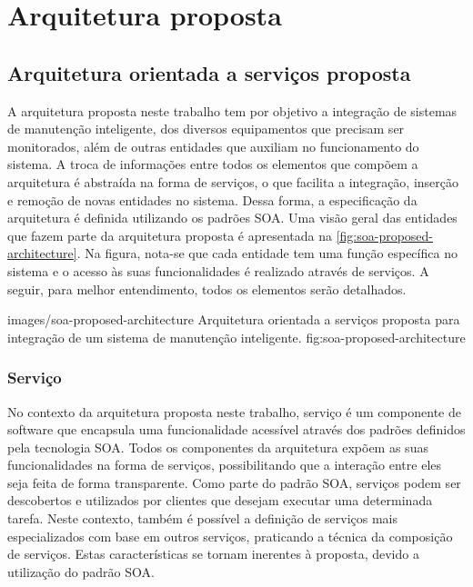 \chapter{Arquitetura proposta}



\section{Arquitetura orientada a serviços proposta}

A arquitetura proposta neste trabalho tem por objetivo a integração de sistemas de manutenção
inteligente, dos diversos equipamentos que precisam ser monitorados, além de outras entidades que
auxiliam no funcionamento do sistema. A troca de informações entre todos os elementos que compõem a
arquitetura é abstraída na forma de serviços, o que facilita a integração, inserção e remoção de
novas entidades no sistema. Dessa forma, a especificação da arquitetura é definida utilizando os
padrões \gls{SOA}. Uma visão geral das entidades que fazem parte da arquitetura proposta é
apresentada na \cref{fig:soa-proposed-architecture}. Na figura, nota-se que cada entidade tem uma função específica no sistema
e o acesso às suas funcionalidades é realizado através de serviços. A seguir, para melhor
entendimento, todos os elementos serão detalhados.

  {images/soa-proposed-architecture}
  {Arquitetura orientada a serviços proposta para integração de um sistema de manutenção
      inteligente.}
  {fig:soa-proposed-architecture}


\subsection{Serviço}

No contexto da arquitetura proposta neste trabalho, serviço é um componente de software que
encapsula uma funcionalidade acessível através dos padrões definidos pela tecnologia \gls{SOA}.
Todos os componentes da arquitetura expõem as suas funcionalidades na forma de serviços,
possibilitando que a interação entre eles seja feita de forma transparente. Como parte do padrão
\gls{SOA}, serviços podem ser descobertos e utilizados por clientes que desejam executar uma
determinada tarefa. Neste contexto, também é possível a definição de serviços mais especializados
com base em outros serviços, praticando a técnica da composição de serviços. Estas características
se tornam inerentes à proposta, devido a utilização do padrão \gls{SOA}.


